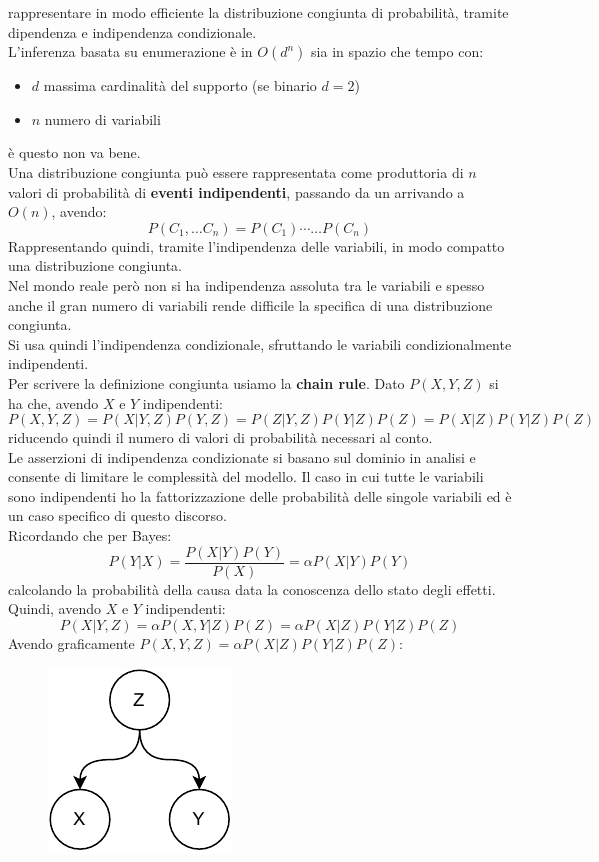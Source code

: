 \documentclass[a4paper,12pt, oneside]{book}
\begin{document}
rappresentare in modo efficiente la distribuzione congiunta di probabilità,
tramite dipendenza e indipendenza condizionale.\\
L'inferenza basata su enumerazione è in $O(d^n)$ sia in spazio che tempo con:
\begin{itemize}
  \item $d$ massima cardinalità del supporto (se binario $d=2$)
  \item $n$ numero di variabili
\end{itemize}
è questo non va bene.\\
Una distribuzione congiunta può essere rappresentata come produttoria di $n$
valori di probabilità di \textbf{eventi indipendenti}, passando da un arrivando
a $O(n)$, avendo:
\[P(C_1,\ldots C_n)=P(C_1)\cdots \ldots P(C_n)\]
Rappresentando quindi, tramite l'indipendenza delle variabili, in modo compatto
una distribuzione congiunta. \\
Nel mondo reale però non si ha indipendenza assoluta tra le variabili e spesso
anche il gran numero di variabili rende difficile la specifica di una
distribuzione congiunta. \\
Si usa quindi l'indipendenza condizionale, sfruttando le variabili
condizionalmente indipendenti. \\
Per scrivere la definizione congiunta usiamo la \textbf{chain rule}.
Dato $P(X,Y,Z)$ si ha che, avendo $X$ e $Y$ indipendenti:
\[P(X,Y,Z)=P(X|Y,Z)P(Y,Z)=P(Z|Y,Z)P(Y|Z)P(Z)=P(X|Z)P(Y|Z)P(Z)\]
riducendo quindi il numero di valori di probabilità necessari al conto.\\
Le asserzioni di indipendenza condizionate si basano sul dominio in analisi e
consente di limitare le complessità del modello. Il caso in cui tutte le
variabili sono indipendenti ho la fattorizzazione delle probabilità delle
singole variabili ed è un caso specifico di questo discorso.\\
Ricordando che per Bayes:
\[P(Y|X)=\frac{P(X|Y)P(Y)}{P(X)}=\alpha P(X|Y)P(Y)\]
calcolando la probabilità della causa data la conoscenza dello stato degli
effetti. Quindi, avendo $X$ e $Y$ indipendenti:
\[P(X|Y,Z)=\alpha P(X,Y|Z)P(Z)=\alpha P(X|Z)P(Y|Z)P(Z)\]
Avendo graficamente $P(X,Y,Z)=\alpha P(X|Z)P(Y|Z)P(Z)$:
\begin{figure}[H]
  \centering
  \includegraphics[scale = 0.9]{img/b2.pdf}
\end{figure}
\end{document}
